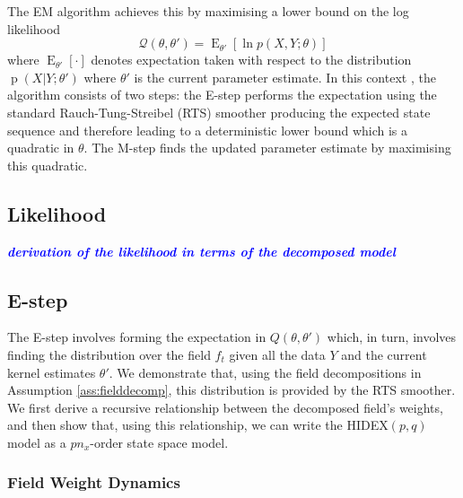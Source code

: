 \documentclass{IEEEtran}
\newcommand{\todo}[1]{\textsf{\emph{\textbf{\textcolor{blue}{#1}}}}}
\DeclareMathOperator{\E}{E}
\DeclareMathOperator{\p}{p}
\begin{document}
The EM algorithm achieves this by maximising a lower bound on the log likelihood
\begin{equation}
	\mathcal{Q}(\theta,\theta')=\E_{\theta'}\left[\ln p(X,Y;\theta)\right]
\end{equation}
where $\E_{\theta'}[\cdot]$ denotes expectation taken with respect to the distribution $\p(X|Y ; \theta')$ where $\theta'$ is the current parameter estimate. In this context \cite{Gibson05}, the algorithm consists of two steps: the E-step performs the expectation using the standard Rauch-Tung-Streibel (RTS) smoother \cite{Rauch65} producing the expected state sequence and therefore leading to a deterministic lower bound which is a quadratic in $\theta$. The M-step finds the updated parameter estimate by maximising this quadratic.

\subsection{Likelihood}

\todo{derivation of the likelihood in terms of the decomposed model}

\subsection{E-step}

The E-step involves forming the expectation in $Q(\theta,\theta')$ which, in turn, involves finding the distribution over the field $f_t$ given all the data $Y$ and the current kernel estimates $\theta'$. We demonstrate that, using the field decompositions in Assumption \ref{ass:fielddecomp}, this distribution is provided by the RTS smoother. We first derive a recursive relationship between the decomposed field's weights, and then show that, using this relationship, we can write the HIDEX$(p,q)$ model as a $pn_x$-order state space model.

\subsubsection{Field Weight Dynamics}
\end{document}
